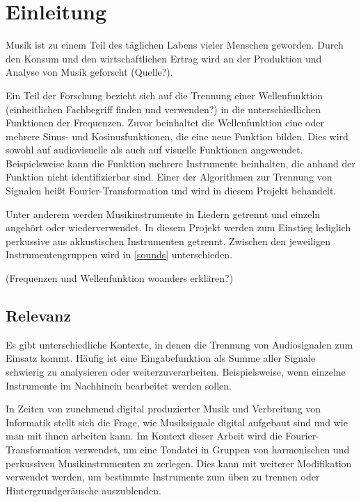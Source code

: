 \chapter{Einleitung}
%

Musik ist zu einem Teil des täglichen Labens vieler Menschen geworden. Durch den Konsum und den wirtschaftlichen Ertrag wird an der Produktion und Analyse von Musik geforscht (Quelle?).

\par

Ein Teil der Forschung bezieht sich auf die Trennung einer Wellenfunktion (einheitlichen Fachbegriff finden und verwenden?) in die unterschiedlichen Funktionen der Frequenzen. Zuvor beinhaltet die Wellenfunktion eine oder mehrere Sinus- und Kosinusfunktionen, die eine neue Funktion bilden. Dies wird sowohl auf audiovisuelle als auch auf visuelle Funktionen angewendet. Beispielsweise kann die Funktion mehrere Instrumente beinhalten, die anhand der Funktion nicht identifizierbar sind. Einer der Algorithmen zur Trennung von Signalen heißt Fourier-Transformation und wird in diesem Projekt behandelt.

\par

Unter anderem werden Musikinstrumente in Liedern getrennt und einzeln angehört oder wiederverwendet. In diesem Projekt werden zum Einstieg lediglich perkussive aus akkustischen Instrumenten getrennt. Zwischen den jeweiligen Instrumentengruppen wird in \cref{sounds} unterschieden.

%
(Frequenzen und Wellenfunktion woanders erklären?)
%

%
\section{Relevanz}
%

Es gibt unterschiedliche Kontexte, in denen die Trennung von Audiosignalen zum Einsatz kommt. Häufig ist eine Eingabefunktion als Summe aller Signale schwierig zu analysieren oder weiterzuverarbeiten. Beispielsweise, wenn einzelne Instrumente im Nachhinein bearbeitet werden sollen.

\par

In Zeiten von zunehmend digital produzierter Musik und Verbreitung von Informatik stellt sich die Frage, wie Musiksignale digital aufgebaut sind und wie man mit ihnen arbeiten kann. Im Kontext dieser Arbeit wird die Fourier-Transformation verwendet, um eine Tondatei in Gruppen von harmonischen und perkussiven Musikinstrumenten zu zerlegen. Dies kann mit weiterer Modifikation verwendet werden, um bestimmte Instrumente zum üben zu trennen oder Hintergrundgeräusche auszublenden.

